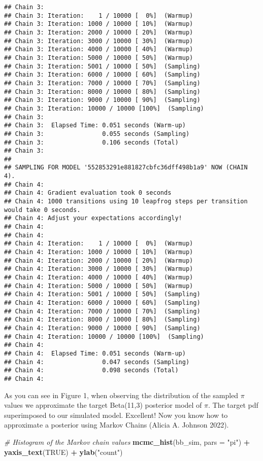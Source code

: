 \documentclass[
]{article}
\newenvironment{Shaded}{\begin{snugshade}}{\end{snugshade}}
\newcommand{\CommentTok}[1]{\textcolor[rgb]{0.56,0.35,0.01}{\textit{#1}}}
\newcommand{\DataTypeTok}[1]{\textcolor[rgb]{0.13,0.29,0.53}{#1}}
\newcommand{\KeywordTok}[1]{\textcolor[rgb]{0.13,0.29,0.53}{\textbf{#1}}}
\newcommand{\NormalTok}[1]{#1}
\newcommand{\OperatorTok}[1]{\textcolor[rgb]{0.81,0.36,0.00}{\textbf{#1}}}
\newcommand{\OtherTok}[1]{\textcolor[rgb]{0.56,0.35,0.01}{#1}}
\newcommand{\StringTok}[1]{\textcolor[rgb]{0.31,0.60,0.02}{#1}}
\begin{document}
\begin{verbatim}
## Chain 3: 
## Chain 3: Iteration:    1 / 10000 [  0%]  (Warmup)
## Chain 3: Iteration: 1000 / 10000 [ 10%]  (Warmup)
## Chain 3: Iteration: 2000 / 10000 [ 20%]  (Warmup)
## Chain 3: Iteration: 3000 / 10000 [ 30%]  (Warmup)
## Chain 3: Iteration: 4000 / 10000 [ 40%]  (Warmup)
## Chain 3: Iteration: 5000 / 10000 [ 50%]  (Warmup)
## Chain 3: Iteration: 5001 / 10000 [ 50%]  (Sampling)
## Chain 3: Iteration: 6000 / 10000 [ 60%]  (Sampling)
## Chain 3: Iteration: 7000 / 10000 [ 70%]  (Sampling)
## Chain 3: Iteration: 8000 / 10000 [ 80%]  (Sampling)
## Chain 3: Iteration: 9000 / 10000 [ 90%]  (Sampling)
## Chain 3: Iteration: 10000 / 10000 [100%]  (Sampling)
## Chain 3: 
## Chain 3:  Elapsed Time: 0.051 seconds (Warm-up)
## Chain 3:                0.055 seconds (Sampling)
## Chain 3:                0.106 seconds (Total)
## Chain 3: 
## 
## SAMPLING FOR MODEL '552853291e881827cbfc36dff498b1a9' NOW (CHAIN 4).
## Chain 4: 
## Chain 4: Gradient evaluation took 0 seconds
## Chain 4: 1000 transitions using 10 leapfrog steps per transition would take 0 seconds.
## Chain 4: Adjust your expectations accordingly!
## Chain 4: 
## Chain 4: 
## Chain 4: Iteration:    1 / 10000 [  0%]  (Warmup)
## Chain 4: Iteration: 1000 / 10000 [ 10%]  (Warmup)
## Chain 4: Iteration: 2000 / 10000 [ 20%]  (Warmup)
## Chain 4: Iteration: 3000 / 10000 [ 30%]  (Warmup)
## Chain 4: Iteration: 4000 / 10000 [ 40%]  (Warmup)
## Chain 4: Iteration: 5000 / 10000 [ 50%]  (Warmup)
## Chain 4: Iteration: 5001 / 10000 [ 50%]  (Sampling)
## Chain 4: Iteration: 6000 / 10000 [ 60%]  (Sampling)
## Chain 4: Iteration: 7000 / 10000 [ 70%]  (Sampling)
## Chain 4: Iteration: 8000 / 10000 [ 80%]  (Sampling)
## Chain 4: Iteration: 9000 / 10000 [ 90%]  (Sampling)
## Chain 4: Iteration: 10000 / 10000 [100%]  (Sampling)
## Chain 4: 
## Chain 4:  Elapsed Time: 0.051 seconds (Warm-up)
## Chain 4:                0.047 seconds (Sampling)
## Chain 4:                0.098 seconds (Total)
## Chain 4:
\end{verbatim}

As you can see in Figure 1, when observing the distribution of the
sampled \(\pi\) values we approximate the target Beta(11,3) posterior
model of \(\pi\). The target pdf superimposed to our simulated model.
Excellent! Now you know how to approximate a posterior using Markov
Chains (Alicia A. Johnson 2022).

\begin{Shaded}
\begin{Highlighting}[]
\CommentTok{# Histogram of the Markov chain values}
\KeywordTok{mcmc_hist}\NormalTok{(bb_sim, }\DataTypeTok{pars =} \StringTok{"pi"}\NormalTok{) }\OperatorTok{+}\StringTok{ }
\StringTok{  }\KeywordTok{yaxis_text}\NormalTok{(}\OtherTok{TRUE}\NormalTok{) }\OperatorTok{+}\StringTok{ }
\StringTok{  }\KeywordTok{ylab}\NormalTok{(}\StringTok{"count"}\NormalTok{)}
\end{Highlighting}
\end{Shaded}
\end{document}
